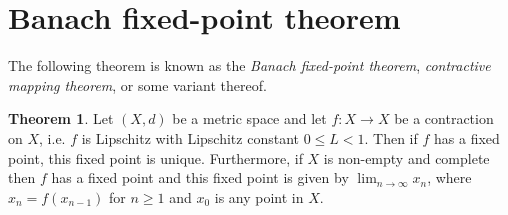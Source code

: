 \documentclass[12pt]{article}
\theoremstyle{definition}
\newtheorem{theorem}{Theorem}
\begin{document}
\section{Banach fixed-point theorem}

The following theorem is known as the \textit{Banach fixed-point theorem}, \textit{contractive mapping theorem}, or some variant thereof.

\begin{theorem}

Let \( (X, d) \) be a metric space and let \( f : X \to X \) be a contraction on \( X \), i.e. \( f \) is Lipschitz with Lipschitz constant \( 0 \leq L < 1 \). Then if \( f \) has a fixed point, this fixed point is unique. Furthermore, if \( X \) is non-empty and complete then \( f \) has a fixed point and this fixed point is given by \( \lim_{n\to\infty} x_n \), where \( x_n = f(x_{n-1}) \) for \( n \geq 1 \) and \( x_0 \) is any point in \( X \).

\end{theorem}
\end{document}
